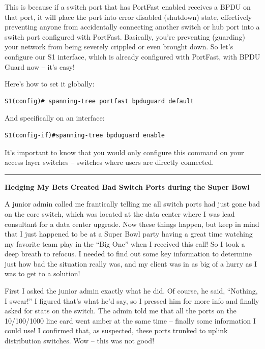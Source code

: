 This is because if a switch port that has PortFast enabled receives a
BPDU on that port, it will place the port into error disabled (shutdown)
state, effectively preventing anyone from accidentally connecting
another switch or hub port into a switch port configured with PortFast.
Basically, you're preventing (guarding) your network from being severely
crippled or even brought down. So let's configure our S1 interface,
which is already configured with PortFast, with BPDU Guard now -- it's
easy!

Here's how to set it globally:

\begin{verbatim}
S1(config)# spanning-tree portfast bpduguard default
\end{verbatim}

And specifically on an interface:

\begin{verbatim}
S1(config-if)#spanning-tree bpduguard enable
\end{verbatim}

It's important to know that you would only configure this command on
your access layer switches -- switches where users are directly
connected.

\begin{center}\rule{0.5\linewidth}{0.5pt}\end{center}

\textbf{Hedging My Bets Created Bad Switch Ports during the Super Bowl}

A junior admin called me frantically telling me all switch ports had
just gone bad on the core switch, which was located at the data center
where I was lead consultant for a data center upgrade. Now these things
happen, but keep in mind that I just happened to be at a Super Bowl
party having a great time watching my favorite team play in the ``Big
One'' when I received this call! So I took a deep breath to refocus. I
needed to find out some key information to determine just how bad the
situation really was, and my client was in as big of a hurry as I was to
get to a solution!

First I asked the junior admin exactly what he did. Of course, he said,
``Nothing, I swear!'' I figured that's what he'd say, so I pressed him
for more info and finally asked for stats on the switch. The admin told
me that all the ports on the 10/100/1000 line card went amber at the
same time -- finally some information I could use! I confirmed that, as
suspected, these ports trunked to uplink distribution switches.
Wow -- this was not good!

